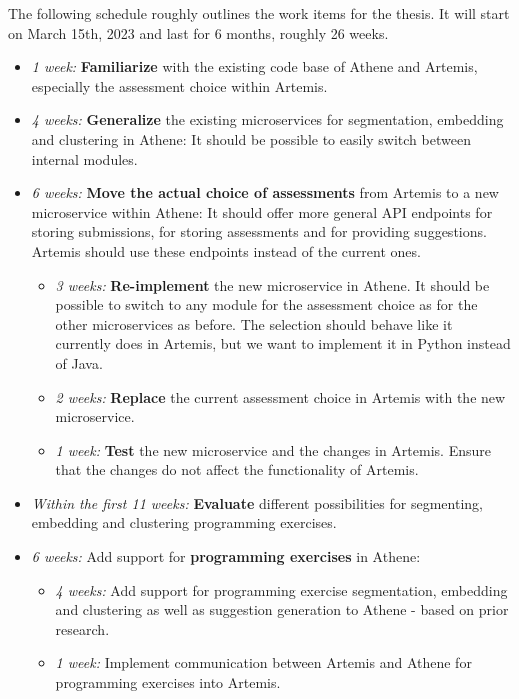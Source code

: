 The following schedule roughly outlines the work items for the thesis. It will start on March 15th, 2023 and last for 6 months, roughly 26 weeks.

\begin{itemize}
    \item \textit{1 week:} \textbf{Familiarize} with the existing code base of Athene and Artemis, especially the assessment choice within Artemis.
    \item \textit{4 weeks:} \textbf{Generalize} the existing microservices for segmentation, embedding and clustering in Athene: It should be possible to easily switch between internal modules.
    \item \textit{6 weeks:} \textbf{Move the actual choice of assessments} from Artemis to a new microservice within Athene: It should offer more general API endpoints for storing submissions, for storing assessments and for providing suggestions. Artemis should use these endpoints instead of the current ones.
    \begin{itemize}
        \item \textit{3 weeks:} \textbf{Re-implement} the new microservice in Athene. It should be possible to switch to any module for the assessment choice as for the other microservices as before. The selection should behave like it currently does in Artemis, but we want to implement it in Python instead of Java.
        \item \textit{2 weeks:} \textbf{Replace} the current assessment choice in Artemis with the new microservice.
        \item \textit{1 week:} \textbf{Test} the new microservice and the changes in Artemis. Ensure that the changes do not affect the functionality of Artemis.
    \end{itemize}
    \item \textit{Within the first 11 weeks:} \textbf{Evaluate} different possibilities for segmenting, embedding and clustering programming exercises. %
    \item \textit{6 weeks:} Add support for \textbf{programming exercises} in Athene:
    \begin{itemize}
        \item \textit{4 weeks:} Add support for programming exercise segmentation, embedding and clustering as well as suggestion generation to Athene - based on prior research.
        \item \textit{1 week:} Implement communication between Artemis and Athene for programming exercises into Artemis.

\end{itemize}
\end{itemize}
